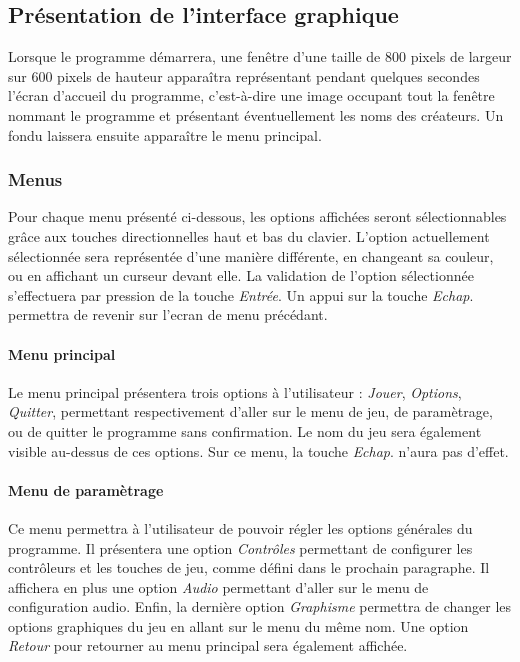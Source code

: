 \subsection{Présentation de l'interface graphique}

Lorsque le programme démarrera, une fenêtre d'une taille de 800 pixels de largeur sur 600 pixels de hauteur apparaîtra représentant pendant quelques secondes l'écran d'accueil du programme, c'est-à-dire une image occupant tout la fenêtre nommant le programme et présentant éventuellement les noms des créateurs. Un fondu laissera ensuite apparaître le menu principal.

\subsubsection{Menus}

Pour chaque menu présenté ci-dessous, les options affichées seront sélectionnables grâce aux touches directionnelles haut et bas du clavier. L'option  actuellement sélectionnée sera représentée d'une manière différente, en changeant sa couleur, ou en affichant un curseur devant elle. La validation de l'option sélectionnée s'effectuera par pression de la touche \emph{Entrée}. Un appui sur la touche \emph{Echap}. permettra de revenir sur l'ecran de menu précédant.

\paragraph{Menu principal}

Le menu principal présentera trois options à l'utilisateur : \emph{Jouer}, \emph{Options}, \emph{Quitter}, permettant respectivement d'aller sur le menu de jeu, de paramètrage, ou de quitter le programme sans confirmation. Le nom du jeu sera également visible au-dessus de ces options. Sur ce menu, la touche \emph{Echap}. n'aura pas d'effet.

\paragraph{Menu de paramètrage}

Ce menu permettra à l'utilisateur de pouvoir régler les options générales du programme. Il présentera une option \emph{Contrôles} permettant de configurer les contrôleurs et les touches de jeu, comme défini dans le prochain paragraphe. Il affichera en plus une option \emph{Audio} permettant d'aller sur le menu de configuration audio. Enfin, la dernière option \emph{Graphisme} permettra de changer les options graphiques du jeu en allant sur le menu du même nom. Une option \emph{Retour} pour retourner au menu principal sera également affichée.

